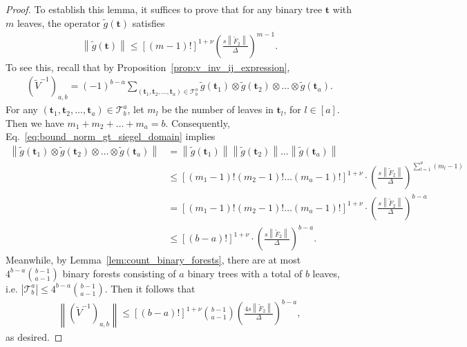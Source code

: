 \documentclass[superscriptaddress,onecolumn,nofootinbib,longbibliography,a4paper,accepted=2026-09-29]{quantumarticle}
\theoremstyle{plain}
\theoremstyle{definition}
\numberwithin{thm}{section}
\numberwithin{assumption}{section}
\numberwithin{lemma}{section}
\numberwithin{prop}{section}
\numberwithin{cor}{section}
\numberwithin{definition}{section}
\numberwithin{rmk}{section}
\numberwithin{equation}{section}
\newcommand{\norm}[1]     {\left\| #1 \right\|}
\newcommand{\lrb}[1]{\left ( #1 \right )}
\newcommand{\mbt}{\mathbf{t}}
\begin{document}
\begin{proof}
To establish this lemma, it suffices to prove that for any binary tree $\mbt$ with $m$ leaves, the operator $\tilde{g}(\mbt)$ satisfies
\begin{align}
\norm{\tilde{g}(\mbt)} \le [(m-1)!]^{1+\nu}\lrb{\frac{s\norm{\tilde{F}_2}}{\Delta}}^{m-1}.
\label{eq:bound_norm_gt_siegel_domain}
\end{align}
To see this, recall that by Proposition~\ref{prop:v_inv_ij_expression}, 
\begin{align}
    \lrb{\tilde{V}^{-1}}_{a,b} = (-1)^{b-a} \sum_{(\mbt_1,\mbt_2,\dots,\mbt_a) \in \mathcal{T}^a_b} \tilde{g}(\mbt_1) \otimes \tilde{g}(\mbt_2) \otimes \dots \otimes \tilde{g}(\mbt_a).        
\end{align}
For any $(\mbt_1,\mbt_2,\dots,\mbt_a) \in \mathcal{T}^a_b$, let $m_l$ be the number of leaves in $\mbt_l$, for $l \in [a]$. Then we have $m_1+m_2+\dots+m_a=b$. Consequently,  Eq.~\eqref{eq:bound_norm_gt_siegel_domain} implies
\begin{align}
\norm{\tilde{g}(\mbt_1) \otimes \tilde{g}(\mbt_2) \otimes \dots \otimes \tilde{g}(\mbt_a)}
&=\norm{\tilde{g}(\mbt_1)}\norm{\tilde{g}(\mbt_2)} \dots \norm{\tilde{g}(\mbt_a)} \\
&\le [(m_1-1)!(m_2-1)!\dots(m_a-1)!]^{1+\nu} \cdot
\lrb{\frac{s\norm{\tilde{F}_2}}{\Delta}}^{\sum_{l=1}^a (m_l-1)} \\
&=[(m_1-1)!(m_2-1)!\dots(m_a-1)!]^{1+\nu}\cdot \lrb{\frac{s\norm{\tilde{F}_2}}{\Delta}}^{b-a} \\
&\le [(b-a)!]^{1+\nu}\cdot \lrb{\frac{s\norm{\tilde{F}_2}}{\Delta}}^{b-a}.
\end{align}
Meanwhile, by Lemma~\ref{lem:count_binary_forests}, there are at most $4^{b-a}\binom{b-1}{a-1}$ binary forests consisting of $a$ binary trees with a total of $b$ leaves, i.e. $|\mathcal{T}^a_b|\le 4^{b-a}\binom{b-1}{a-1}$. Then it follows that
\begin{align}
\norm{\lrb{\tilde{V}^{-1}}_{a,b}} \le [(b-a)!]^{1+\nu}\binom{b-1}{a-1}\lrb{\frac{4s\norm{\tilde{F}_2}}{\Delta}}^{b-a}, 
\end{align}    
as desired.


\end{proof}
\end{document}
